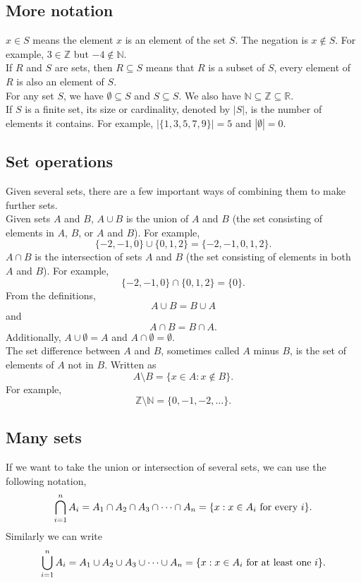 \documentclass[10pt, a4paper]{article}
\newcommand{\N}{\mathbb{N}}
\newcommand{\Z}{\mathbb{Z}}
\newcommand{\R}{\mathbb{R}}
\begin{document}
\subsection{More notation}
$x \in S$ means the element $x$ is an element of the set $S$. The negation is $x \notin S$. For example, $3 \in \Z$ but $-4 \notin \N$. \\
If $R$ and $S$ are sets, then $R \subseteq S$ means that $R$ is a subset of $S$, every element of $R$ is also an element of $S$. \\
For any set $S$, we have $\emptyset \subseteq S$ and $S \subseteq S$. We also have $\N \subseteq \Z \subseteq \R$. \\
If $S$ is a finite set, its size or cardinality, denoted by $|S|$, is the number of elements it contains. For example, $|\{1, 3, 5, 7, 9\}| = 5$ and $|\emptyset| = 0$.

\subsection{Set operations}
Given several sets, there are a few important ways of combining them to make further sets. \\
Given sets $A$ and $B$, $A \cup B$ is the union of $A$ and $B$ (the set consisting of elements in $A$, $B$, or $A$ and $B$). For example,
\[
\{-2, -1, 0\} \cup \{0, 1, 2\} = \{-2, -1, 0, 1, 2\}.
\]
$A \cap B$ is the intersection of sets $A$ and $B$ (the set consisting of elements in both $A$ and $B$). For example,
\[
\{-2, -1, 0\} \cap \{0, 1, 2\} = \{0\}.
\]
From the definitions,
\[
A \cup B = B \cup A
\]
and
\[
A \cap B = B \cap A.
\]
Additionally, $A \cup \emptyset = A$ and $A \cap \emptyset = \emptyset$. \\
The set difference between $A$ and $B$, sometimes called $A$ minus $B$, is the set of elements of $A$ not in $B$. Written as
\[
A \setminus B = \{x \in A : x \notin B\}.
\]
For example,
\[
\Z \setminus \N = \{0, -1, -2, \dotsc\}.
\]

\subsection{Many sets}
If we want to take the union or intersection of several sets, we can use the following notation,
\[
\bigcap_{i = 1}^{n}{A_i} = A_1 \cap A_2 \cap A_3 \cap \cdots \cap A_n = \{x : x \in A_i \textnormal{ for every } i\}.
\]
Similarly we can write
\[
\bigcup_{i = 1}^{n}{A_i} = A_1 \cup A_2 \cup A_3 \cup \cdots \cup A_n = \{x : x \in A_i \textnormal{ for at least one } i\}.
\]
\end{document}

